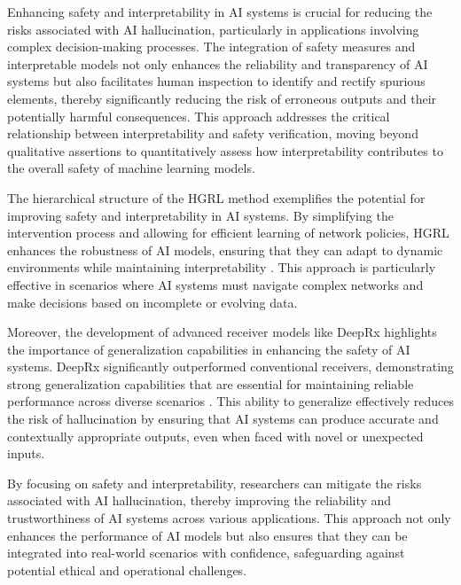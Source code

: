 Enhancing safety and interpretability in AI systems is crucial for reducing the risks associated with AI hallucination, particularly in applications involving complex decision-making processes. The integration of safety measures and interpretable models not only enhances the reliability and transparency of AI systems but also facilitates human inspection to identify and rectify spurious elements, thereby significantly reducing the risk of erroneous outputs and their potentially harmful consequences. This approach addresses the critical relationship between interpretability and safety verification, moving beyond qualitative assertions to quantitatively assess how interpretability contributes to the overall safety of machine learning models. \cite{wei2022safetyinterpretablemachinelearning}



The hierarchical structure of the HGRL method exemplifies the potential for improving safety and interpretability in AI systems. By simplifying the intervention process and allowing for efficient learning of network policies, HGRL enhances the robustness of AI models, ensuring that they can adapt to dynamic environments while maintaining interpretability \cite{chen2024adaptivenetworkinterventioncomplex}. This approach is particularly effective in scenarios where AI systems must navigate complex networks and make decisions based on incomplete or evolving data.



Moreover, the development of advanced receiver models like DeepRx highlights the importance of generalization capabilities in enhancing the safety of AI systems. DeepRx significantly outperformed conventional receivers, demonstrating strong generalization capabilities that are essential for maintaining reliable performance across diverse scenarios \cite{luostari2024adaptingrealityovertheairvalidation}. This ability to generalize effectively reduces the risk of hallucination by ensuring that AI systems can produce accurate and contextually appropriate outputs, even when faced with novel or unexpected inputs.



By focusing on safety and interpretability, researchers can mitigate the risks associated with AI hallucination, thereby improving the reliability and trustworthiness of AI systems across various applications. This approach not only enhances the performance of AI models but also ensures that they can be integrated into real-world scenarios with confidence, safeguarding against potential ethical and operational challenges.



